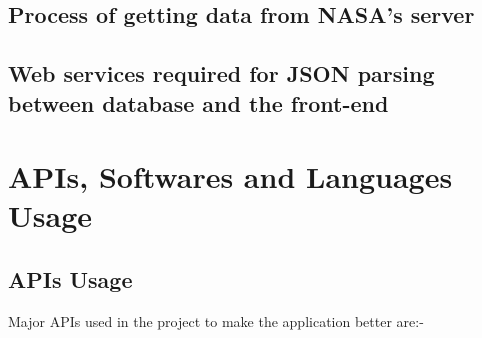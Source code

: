 \subsection{Process of getting data from NASA's server}
\subsection{Web services required for JSON parsing between database and the front-end}






\section{APIs, Softwares and Languages Usage}

\subsection{APIs Usage}

Major APIs used in the project to make the application better are:-

